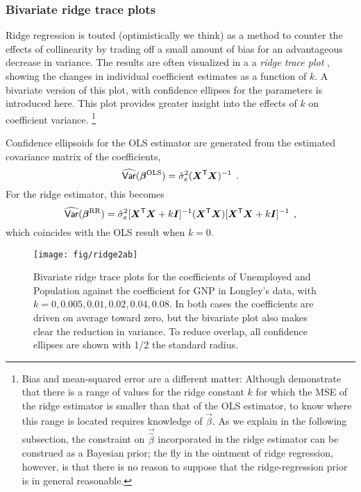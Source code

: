 \subsubsection{Bivariate ridge trace plots}\label{sec:ridge2}

Ridge regression is touted (optimistically we think) as a method to counter the effects
of collinearity by trading off a small amount of bias for an
advantageous decrease in variance.  The results are often
visualized in a a \emph{ridge trace plot}
\citep{HoerlKennard:1970b},
showing the changes
in individual coefficient estimates as a function of $k$.
A bivariate version of this plot, with confidence ellipses for
the parameters is introduced here.  This plot provides greater
insight into the effects of $k$ on coefficient variance.
\footnote{Bias and mean-squared error are a different matter: Although \citet{HoerlKennard:1970a} demonstrate that there is a range of values for the ridge constant $k$ for which the MSE of the ridge estimator is smaller than that of the OLS estimator, to know where this range is located requires knowledge of $\vec{\beta}$. As we explain in the following subsection, the constraint on $\vec{\hat{\beta}}$ incorporated in the ridge estimator can be construed as a Bayesian prior; the fly in the ointment of ridge regression, however, is that there is no reason to suppose that the ridge-regression prior is in general reasonable.}

Confidence ellipsoids for the OLS estimator are generated
from the estimated covariance matrix of the coefficients,
\begin{equation*}
\widehat{\mathsf{Var}} (\bm{\beta}^{\mathrm{OLS}}) = \hat{\sigma}^2_e (\bm{X}^\mathsf{T} \bm{X})^{-1} \:\: .
\end{equation*}
For the ridge estimator, this becomes
\citep{Marquardt:1970}
\begin{equation}
\widehat{\mathsf{Var}} (\bm{\beta}^{\mathrm{RR}}) = \hat{\sigma}^2_e
    [\bm{X}^\mathsf{T} \bm{X} + k \bm{I}]^{-1}
    (\bm{X}^\mathsf{T} \bm{X})
    [\bm{X}^\mathsf{T} \bm{X} + k \bm{I}]^{-1} \:\: ,
\end{equation}
which coincides with the OLS result when $k=0$.
	
\begin{figure}[htb!]
  \centering
  \texttt{[image: fig/ridge2ab]}    %
  \caption{Bivariate ridge trace plots for the coefficients of Unemployed and Population
  	against the coefficient for GNP in Longley's data, with
  	$k = 0, 0.005, 0.01, 0.02, 0.04, 0.08$.
  	In both cases the coefficients are driven on average toward zero, but the bivariate
  	plot also makes clear the reduction in variance.
  	To reduce overlap, all confidence ellipses are shown with 1/2 the standard radius.}%
  \label{fig:ridge2}
\end{figure}

